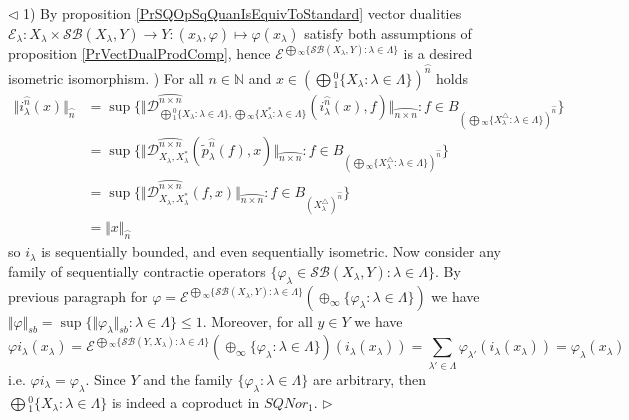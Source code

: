 \documentclass[12pt]{article}
\newenvironment{proof}{\par $\triangleleft$}{$\triangleright$}
\begin{document}
\begin{proof} 1) By proposition \ref{PrSQOpSqQuanIsEquivToStandard} vector dualities $\mathcal{E}_\lambda:X_\lambda\times\mathcal{SB}(X_\lambda,Y)\to Y:(x_\lambda,\varphi)\mapsto \varphi(x_\lambda)$ satisfy both assumptions of proposition \ref{PrVectDualProdComp}, hence $\mathcal{E}^{\bigoplus{}_\infty\{\mathcal{SB}(X_\lambda,Y):\lambda\in\Lambda\}}$ is a desired isometric isomorphism.
) For all $n\in\mathbb{N}$ and $x\in \left(\bigoplus{}_1^0\{X_\lambda:\lambda\in\Lambda\}\right)^{\wideparen{n}}$ holds
$$
\begin{aligned}
\Vert i_\lambda^{\wideparen{n}}(x)\Vert_{\wideparen{n}}
&=\sup\{\Vert\mathcal{D}_{\bigoplus{}_1^0\{X_\lambda:\lambda\in \Lambda\},\bigoplus{}_\infty\{X_\lambda^*:\lambda\in \Lambda\}}^{\wideparen{n\times n}}(i_\lambda^{\wideparen{n}}(x),f)\Vert_{\wideparen{n\times n}}: f\in B_{(\bigoplus{}_\infty\{X_\lambda^\triangle:\lambda\in \Lambda\})^{\wideparen{n}}}\}\\
&=\sup\{\Vert\mathcal{D}_{X_\lambda,X_\lambda^*}^{\wideparen{n\times n}}(\tilde{p}_\lambda^{\wideparen{n}}(f),x)\Vert_{\wideparen{n\times n}}: f\in B_{(\bigoplus{}_\infty\{X_\lambda^\triangle:\lambda\in \Lambda\})^{\wideparen{n}}}\}\\
&=\sup\{\Vert\mathcal{D}_{X_\lambda,X_\lambda^*}^{\wideparen{n\times n}}(f,x)\Vert_{\wideparen{n\times n}}: f\in B_{(X_\lambda^\triangle)^{\wideparen{n}}}\}\\
&=\Vert x\Vert_{\wideparen{n}}
\end{aligned}
$$ 
so $i_\lambda$ is sequentially bounded, and even sequentially isometric. Now consider any family of sequentially contractie operators $\{\varphi_\lambda\in\mathcal{SB}(X_\lambda,Y):\lambda\in\Lambda\}$. By previous paragraph for  $\varphi=\mathcal{E}^{\bigoplus{}_\infty\{\mathcal{SB}(X_\lambda,Y):\lambda\in\Lambda\}}(\oplus_\infty\{\varphi_\lambda:\lambda\in\Lambda\})$ we have $\Vert\varphi\Vert_{sb}=\sup\{\Vert\varphi_\lambda\Vert_{sb}:\lambda\in\Lambda\}\leq 1$. Moreover, for all $y\in Y$ we have
$$
\varphi i_\lambda(x_\lambda)
=\mathcal{E}^{\bigoplus{}_\infty\{\mathcal{SB}(Y,X_\lambda):\lambda\in\Lambda\}}(\oplus_\infty\{\varphi_\lambda:\lambda\in\Lambda\})(i_\lambda(x_\lambda))
=\sum\limits_{\lambda'\in\Lambda}\varphi_{\lambda'}(i_\lambda(x_\lambda))
=\varphi_\lambda(x_\lambda)
$$
i.e. $\varphi i_\lambda=\varphi_\lambda$. Since $Y$ and the family $\{\varphi_\lambda:\lambda\in\Lambda\}$ are arbitrary, then $\bigoplus{}_1^0\{X_\lambda:\lambda\in\Lambda\}$ is indeed a coproduct in $SQNor_1$.
\end{proof}
\end{document}
